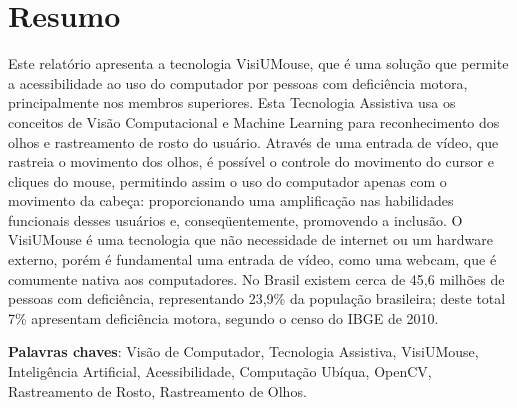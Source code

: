 \chapter*{Resumo}

\noindent
\onehalfspacing
Este relatório apresenta a tecnologia VisiUMouse, que é uma solução que permite a acessibilidade ao uso do computador por pessoas com deficiência motora, principalmente nos membros superiores. Esta Tecnologia Assistiva usa os conceitos de Visão Computacional e Machine Learning para reconhecimento dos olhos e rastreamento de rosto do usuário. Através de uma entrada de vídeo, que rastreia o movimento dos olhos, é possível o controle do movimento do cursor e cliques do mouse, permitindo assim o uso do computador apenas com o movimento da cabeça: proporcionando uma amplificação nas habilidades funcionais desses usuários e, conseqüentemente, promovendo a inclusão. O VisiUMouse é uma tecnologia que não necessidade de internet ou um hardware externo, porém é fundamental uma entrada de vídeo, como uma webcam, que é comumente nativa aos computadores. No Brasil existem cerca de 45,6 milhões de pessoas com deficiência, representando 23,9\% da população brasileira; deste total 7\% apresentam deficiência motora, segundo o censo do IBGE de 2010.


% 
% 

\noindent
\onehalfspacing
\textbf{Palavras chaves}: Visão de Computador, Tecnologia Assistiva, VisiUMouse, Inteligência Artificial, Acessibilidade, Computação Ubíqua, OpenCV, Rastreamento de Rosto, Rastreamento de Olhos.





